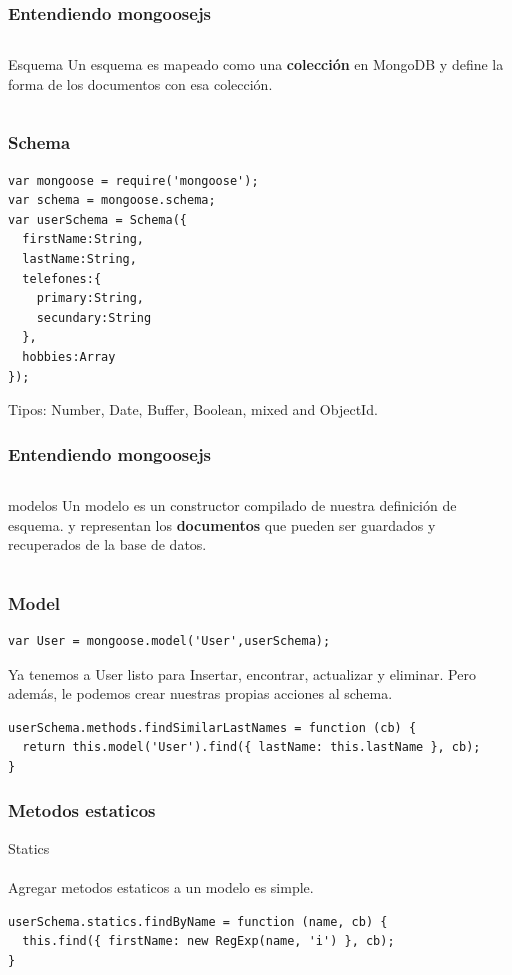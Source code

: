 \documentclass{beamer}
\begin{document}
\begin{frame}
\frametitle{Entendiendo mongoosejs}
\begin{columns}[c]
Esquema
Un esquema es mapeado como una \textbf{colecci\'on} en MongoDB y 
define la forma de los documentos  con esa colecci\'on.
\end{columns}
\end{frame}

\begin{frame}[fragile]
\frametitle{Schema}
\medskip
\begin{lstlisting}
var mongoose = require('mongoose');
var schema = mongoose.schema;
var userSchema = Schema({
  firstName:String,
  lastName:String,
  telefones:{
    primary:String,
    secundary:String
  },
  hobbies:Array
});

\end{lstlisting}
Tipos: Number, Date, Buffer, Boolean, mixed and ObjectId.
\end{frame}

\begin{frame}
\frametitle{Entendiendo mongoosejs}
\begin{columns}[c]
modelos
Un modelo es un constructor compilado de nuestra definici\'on de esquema.
y representan los \textbf{documentos} que pueden ser guardados y recuperados de la base de datos.
\end{columns}
\end{frame}

\begin{frame}[fragile]
\frametitle{Model}
\medskip
\begin{lstlisting}
var User = mongoose.model('User',userSchema);
\end{lstlisting}
Ya tenemos a User listo para Insertar, encontrar, actualizar y eliminar.
Pero adem\'as, le podemos crear nuestras propias acciones al schema.

\begin{lstlisting}
userSchema.methods.findSimilarLastNames = function (cb) {
  return this.model('User').find({ lastName: this.lastName }, cb);
}
\end{lstlisting}
\end{frame}

\begin{frame}[fragile]
\frametitle{Metodos estaticos}
Statics
\\~\\
Agregar metodos estaticos a un modelo es simple.
\medskip
\begin{lstlisting}
userSchema.statics.findByName = function (name, cb) {
  this.find({ firstName: new RegExp(name, 'i') }, cb);
}
\end{lstlisting}
\end{frame}
\end{document}
